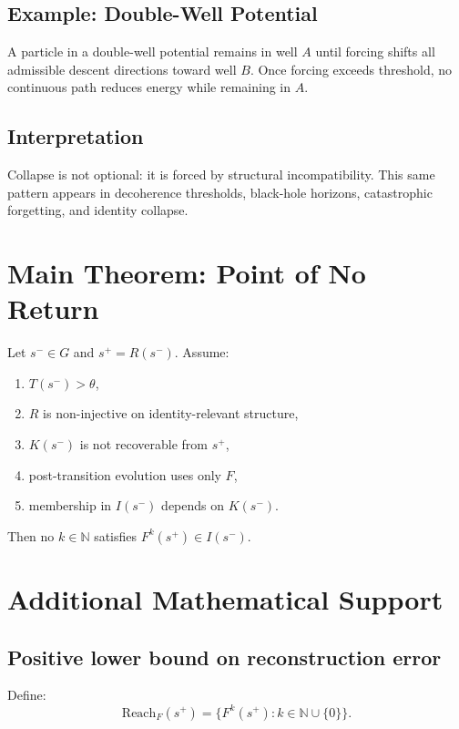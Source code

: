 \documentclass[12pt]{article}
\begin{document}
\subsection*{Example: Double-Well Potential}

A particle in a double-well potential remains in well $A$ until forcing shifts all admissible descent directions toward well $B$. Once forcing exceeds threshold, no continuous path reduces energy while remaining in $A$.

\subsection*{Interpretation}

Collapse is not optional: it is forced by structural incompatibility. This same pattern appears in decoherence thresholds, black-hole horizons, catastrophic forgetting, and identity collapse.

\section{Main Theorem: Point of No Return}

\begin{theorem}
Let $s^- \in G$ and $s^+ = R(s^-)$. Assume:
\begin{enumerate}
\item $T(s^-) > \theta$,
\item $R$ is non-injective on identity-relevant structure,
\item $K(s^-)$ is not recoverable from $s^+$,
\item post-transition evolution uses only $F$,
\item membership in $I(s^-)$ depends on $K(s^-)$.
\end{enumerate}
Then no $k \in \mathbb{N}$ satisfies $F^k(s^+) \in I(s^-)$.
\end{theorem}

\section{Additional Mathematical Support}

\subsection{Positive lower bound on reconstruction error}

Define:
\[
\text{Reach}_F(s^+) = \{ F^k(s^+) : k \in \mathbb{N} \cup \{0\} \}.
\]
\end{document}
